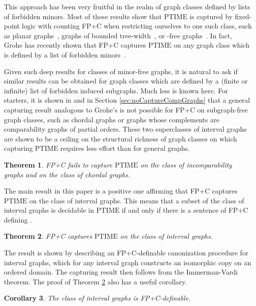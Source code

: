 \documentclass[10pt]{article}
\newtheorem{thm}{Theorem}[section]
\newtheorem{cor}[thm]{Corollary}
\theoremstyle{remark}
\theoremstyle{definition}
\theoremstyle{plain}
\newcommand{\logic}[1]{\textsf{\upshape\relsize{-0.5}#1}\xspace}
\newcommand{\FPC}{\logic{FP+C}}
\newcommand{\cclass}[1]{\ensuremath{\mathrm{#1}}\xspace}
\newcommand{\PTIME}{\cclass{PTIME}}
\begin{document}
This approach has been very fruitful in the realm of graph classes defined by lists of forbidden minors. Most of these results show that \PTIME is captured by fixed-point logic with counting \FPC when restricting ourselves to one such class, such as planar graphs~\cite{gro98a}, graphs of bounded tree-width~\cite{gromar99}, or -free graphs~\cite{grohe08definable}. In fact, Grohe has recently shown that \FPC captures \PTIME on any graph class which is defined by a list of forbidden minors~\cite{grohe10fixed}.

Given such deep results for classes of minor-free graphs, it is natural to ask if similar results can be obtained for graph classes which are defined by a (finite or infinite) list of forbidden induced subgraphs. Much less is known here. For starters, it is shown in \cite{grohe09fixed-point} and in Section \ref{sec:noCaptureCompGraphs} that a general capturing result analogous to Grohe's is not possible for \FPC on subgraph-free graph classes, such as chordal graphs or graphs whose complements are comparability graphs of partial orders. These two superclasses of interval graphs are shown to be a ceiling on the structural richness of graph classes on which capturing \PTIME requires less effort than for general graphs. 
\begin{thm}\label{thm:notCaptureCompGraphs}
 \FPC fails to capture \PTIME on the class of incomparability graphs and on the class of chordal graphs.
\end{thm}




The main result in this paper is a positive one affirming that \FPC captures \PTIME on the class of interval graphs. This means that a subset  of the class of interval graphs is decidable in \PTIME if and only if there is a sentence of \FPC defining .

\begin{thm}\label{thm:captureIntGraphs}
 \FPC captures \PTIME on the class of interval graphs.
\end{thm}

The result is shown by describing an \FPC-definable canonization procedure for interval graphs, which for any interval graph constructs an isomorphic copy on an ordered domain. The capturing result then follows from the Immerman-Vardi theorem. The proof of Theorem \ref{thm:captureIntGraphs} also has a useful corollary.

\begin{cor}\label{cor:IntGraphsDefinable}
 The class of interval graphs is \FPC-definable.
\end{cor}
\end{document}
